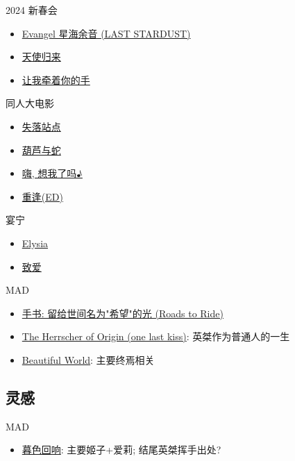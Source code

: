 \documentclass[a4paper]{article}
\begin{document}
2024 新春会

\begin{itemize}
    \item \href{https://www.bilibili.com/video/BV13c411v7DR/}{Evangel 星海余音 (LAST STARDUST)}
    \item \href{https://www.bilibili.com/video/BV1pp4y1m7Uh/}{天使归来}
    \item \href{https://www.bilibili.com/video/BV1te411h7aj/}{让我牵着你的手}
\end{itemize}

同人大电影

\begin{itemize}
    \item \href{https://www.bilibili.com/video/BV1Ud4y1z7mY/?t=309}{失落站点}
    \item \href{https://www.bilibili.com/video/BV1w24y1R7s9}{葫芦与蛇}
    \item \href{https://www.bilibili.com/video/BV1LD4y117nq/}{嗨, 想我了吗♪}
    \item \href{https://www.bilibili.com/video/BV17D4y117DV/}{重逢(ED)}
\end{itemize}

宴宁

\begin{itemize}
    \item \href{https://www.bilibili.com/video/BV1dq4y1N7ry/}{Elysia}
    \item \href{https://www.bilibili.com/video/BV1bB4y1L7qh/}{致爱}
\end{itemize}

MAD

\begin{itemize}
    \item \href{https://www.bilibili.com/video/BV1cG41157Jx/}{手书: 留给世间名为"希望"的光 (Roads to Ride)}
    \item \href{https://www.bilibili.com/video/BV1nV4y1g7ti/}{The Herrscher of Origin (one last kiss)}: 英桀作为普通人的一生
    \item \href{https://www.bilibili.com/video/BV1XX4y1o7yN/}{Beautiful World}: 主要终焉相关
\end{itemize}

\subsection{灵感}

MAD

\begin{itemize}
    \item \href{https://www.bilibili.com/video/BV19E421c7gF/}{暮色回响}: 主要姬子+爱莉; 结尾英桀挥手出处?
\end{itemize}
\end{document}
